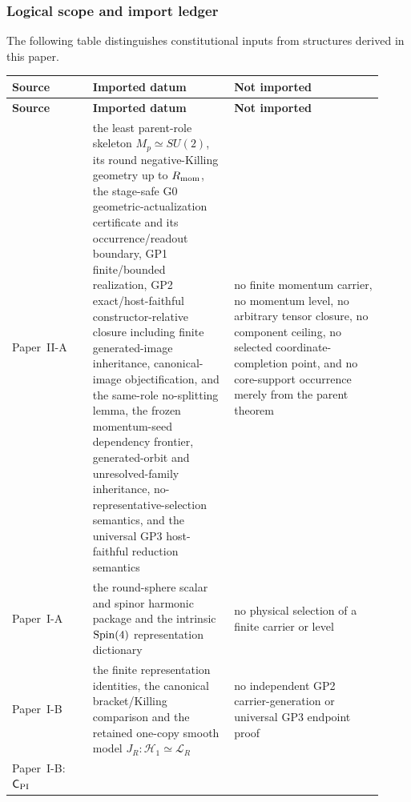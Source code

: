 \documentclass[12pt,a4paper]{article}
\begin{document}
\subsubsection{Logical scope and import ledger}
\label{p2b:subsec:import-ledger}
The following table distinguishes constitutional inputs from structures
derived in this paper.
\begingroup
\small
\setlength{\LTpre}{6pt}
\setlength{\LTpost}{6pt}
\renewcommand*{\theHtable}{importledger.\arabic{table}}%
\begin{longtable}{L{0.20\linewidth}L{0.35\linewidth}L{0.37\linewidth}}
\toprule
\textbf{Source} & \textbf{Imported datum} & \textbf{Not imported} \\
\midrule
\endfirsthead
\toprule
\textbf{Source} & \textbf{Imported datum} & \textbf{Not imported} \\
\midrule
\endhead
Paper~II-A
& the least parent-role skeleton
\(M_p\simeq SU(2)\), its round negative-Killing geometry up to \(R_{\mathrm{mom}}\),
the stage-safe G0 geometric-actualization certificate and its
occurrence/readout boundary,
GP1 finite/bounded realization, GP2 exact/host-faithful constructor-relative
closure including finite generated-image inheritance, canonical-image
objectification, and the same-role no-splitting lemma, the frozen momentum-seed
dependency frontier, generated-orbit and unresolved-family inheritance,
no-representative-selection semantics, and the universal GP3 host-faithful
reduction semantics
& no finite momentum carrier, no momentum level, no arbitrary tensor closure,
no component ceiling, no selected coordinate-completion point, and no
core-support occurrence merely from the parent theorem \\
Paper~I-A
& the round-sphere scalar and spinor harmonic package and the intrinsic
\(\mathrm{Spin}(4)\) representation dictionary
& no physical selection of a finite carrier or level \\
Paper~I-B
& the finite representation identities, the canonical bracket/Killing
comparison and the retained one-copy smooth model
\(J_R:\mathcal H_1\simeq\mathcal L_R\)
& no independent GP2 carrier-generation or universal GP3 endpoint proof \\
Paper~I-B: \(\mathsf C_{\rm PI}\)


\end{longtable}
\end{document}
